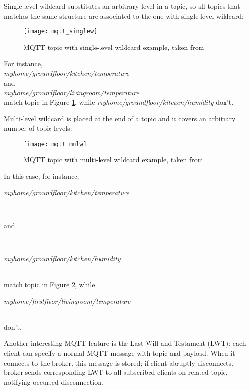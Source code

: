 Single-level wildcard substitutes an arbitrary level in a topic, so all topics that matches the same structure are associated to the one with single-level wildcard:

\begin{figure}[H]

    \centering
    \texttt{[image: mqtt\_singlew]}
    \caption{MQTT topic with single-level wildcard example, taken from \cite{site:hivemq}}
    \label{fig:mqtt_singlew}

\end{figure}

For instance,\\\textit{myhome\slash{}groundfloor\slash{}kitchen\slash{}temperature}\\and\\\textit{myhome\slash{}groundfloor\slash{}livingroom\slash{}temperature}\\match topic in Figure \ref{fig:mqtt_singlew}, while \textit{myhome\slash{}groundfloor\slash{}kitchen\slash{}humidity} don't.

Multi-level wildcard is placed at the end of a topic and it covers an arbitrary number of topic levels:

\begin{figure}[H]

    \centering
    \texttt{[image: mqtt\_mulw]}
    \caption{MQTT topic with multi-level wildcard example, taken from \cite{site:hivemq}}
    \label{fig:mqtt_mulw}

\end{figure}

In this case, for instance,\\
\centerline{\textit{myhome\slash{}groundfloor\slash{}kitchen\slash{}tem\-per\-a\-ture}}\\
\centerline{and}\\
\centerline{\textit{myhome\slash{}groundfloor\slash{}kitchen\slash{}humidity}}\\
match topic in Figure \ref{fig:mqtt_mulw}, while\\
\centerline{\textit{myhome\slash{}firstfloor\slash{}livingroom\slash{}temperature}}\\
don't.

Another interesting MQTT feature is the Last Will and Testament (LWT): each client can specify a normal MQTT message with topic and payload. When it connects to the broker, this message is stored; if client abruptly disconnects, broker sends corresponding LWT to all subscribed clients on related topic, notifying occurred disconnection.





